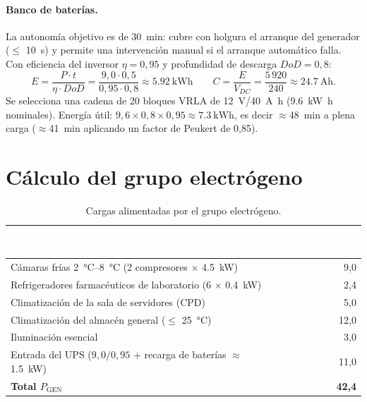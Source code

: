 \documentclass[11pt,a4paper,oneside]{report}
\begin{document}
\paragraph{Banco de baterías.} La autonomía objetivo es de \SI{30}{\minute}: cubre con
holgura el arranque del generador ($\leq$ \SI{10}{\second}) y permite una intervención
manual si el arranque automático falla. Con eficiencia del inversor $\eta=0{,}95$ y
profundidad de descarga $DoD=0{,}8$:
\[
E = \frac{P\cdot t}{\eta\cdot DoD}=\frac{9{,}0\cdot 0{,}5}{0{,}95\cdot 0{,}8}\approx \SI{5,92}{\kilo\watt\hour}
\qquad
C = \frac{E}{V_{DC}}=\frac{5\,920}{240}\approx \SI{24,7}{\ampere\hour}.
\]
Se selecciona una cadena de 20 bloques VRLA de \SI{12}{\volt}/\SI{40}{\ampere\hour}
(\SI{9,6}{\kilo\watt\hour} nominales). Energía útil:
$9{,}6\times0{,}8\times0{,}95\approx\SI{7,3}{\kilo\watt\hour}$, es decir
$\approx$\SI{48}{\minute} a plena carga ($\approx$\SI{41}{\minute} aplicando un factor de
Peukert de 0,85).

\section{Cálculo del grupo electrógeno}

\begin{table}[htbp]
\centering\small
\caption{Cargas alimentadas por el grupo electrógeno.}
\label{tab:cargas-gen}
\begin{tabularx}{\textwidth}{@{}X r@{}}
\toprule
\rowcolor{fvVerdeOsc}\textcolor{white}{\textbf{Carga}} & \textcolor{white}{\textbf{Potencia (kW)}} \\
\midrule
Cámaras frías \SIrange{2}{8}{\celsius} (2 compresores $\times$ \SI{4,5}{\kilo\watt}) & 9,0 \\
Refrigeradores farmacéuticos de laboratorio (6 $\times$ \SI{0,4}{\kilo\watt})        & 2,4 \\
Climatización de la sala de servidores (CPD)                                         & 5,0 \\
Climatización del almacén general ($\leq$ \SI{25}{\celsius})                         & 12,0 \\
Iluminación esencial                                                                  & 3,0 \\
Entrada del UPS ($9{,}0/0{,}95$ + recarga de baterías $\approx$ \SI{1,5}{\kilo\watt}) & 11,0 \\
\midrule
\textbf{Total $P_{\text{GEN}}$} & \textbf{42,4} \\
\bottomrule
\end{tabularx}
\end{table}
\end{document}
